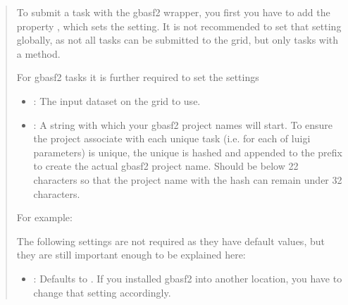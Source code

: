 \documentclass[letterpaper,10pt,english]{sphinxmanual}
\begin{document}
\begin{fulllineitems}
\begin{description}
\begin{quote}
To submit a task with the gbasf2 wrapper, you first you have to add the property
, which sets the  setting.
It is not recommended to set that setting globally, as not all tasks can be submitted to the grid,
but only tasks with a  method.

For gbasf2 tasks it is further required to set the settings
\begin{itemize}
\item {} 
: The input dataset on the grid to use.

\item {} 
: A string with which your gbasf2 project names will start.
To ensure the project associate with each unique task (i.e. for each of luigi parameters)
is unique, the unique  is hashed and appended to the prefix
to create the actual gbasf2 project name.
Should be below 22 characters so that the project name with the hash can remain
under 32 characters.

\end{itemize}

For example:

\begin{sphinxVerbatim}[commandchars=\\\{\}]
 
      
      
      
\end{sphinxVerbatim}

The following settings are not required as they have default values, but they are still important enough
to be explained here:
\begin{itemize}
\item {} 
: Defaults to . If you installed gbasf2 into another
location, you have to change that setting accordingly.


\end{itemize}
\end{quote}
\end{description}
\end{fulllineitems}
\end{document}
